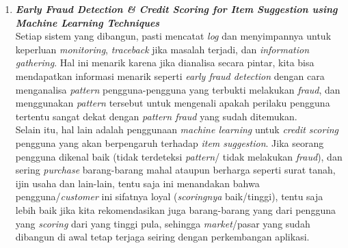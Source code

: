\begin{enumerate}
		\item \textbf{\textit{Early Fraud Detection \& Credit Scoring for Item Suggestion using Machine Learning Techniques}}\\
			Setiap sistem yang dibangun, pasti mencatat \textit{log} dan menyimpannya untuk keperluan \textit{monitoring}, \textit{traceback} jika masalah terjadi, dan \textit{information gathering}. Hal ini menarik karena jika dianalisa secara pintar, kita bisa mendapatkan informasi menarik seperti \textit{early fraud detection} dengan cara menganalisa \textit{pattern} pengguna-pengguna yang terbukti melakukan \textit{fraud}, dan menggunakan \textit{pattern} tersebut untuk mengenali apakah perilaku pengguna tertentu sangat dekat dengan \textit{pattern fraud} yang sudah ditemukan. \\Selain itu, hal lain adalah penggunaan \textit{machine learning} untuk \textit{credit scoring} pengguna yang akan berpengaruh terhadap \textit{item suggestion}. Jika seorang pengguna dikenal baik (tidak terdeteksi \textit{pattern}/ tidak melakukan \textit{fraud}), dan sering \textit{purchase} barang-barang mahal ataupun berharga seperti surat tanah, ijin usaha dan lain-lain, tentu saja ini menandakan bahwa pengguna/\textit{customer} ini sifatnya loyal (\textit{scoringnya} baik/tinggi), tentu saja lebih baik jika kita rekomendasikan juga barang-barang yang dari pengguna yang \textit{scoring} dari yang tinggi pula, sehingga \textit{market}/pasar yang sudah dibangun di awal tetap terjaga seiring dengan perkembangan aplikasi.
	\end{enumerate}
